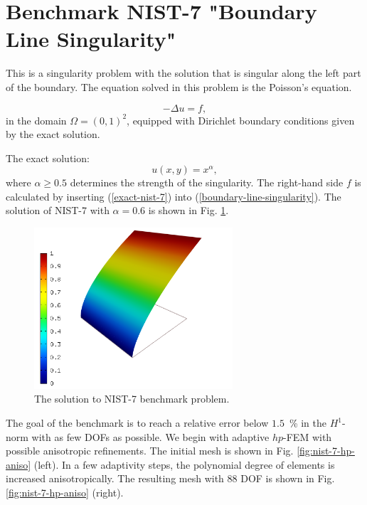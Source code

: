 \section{Benchmark NIST-7 "Boundary Line Singularity"}
\label{sec:bench-7}

This is a singularity problem with the solution that is singular along the left part of the boundary.
The equation solved in this problem is the Poisson's equation.

\begin{equation} \label{boundary-line-singularity}
-\Delta u = f,
\end{equation}
in the domain $\Omega = (0, 1)^2$, equipped with Dirichlet boundary conditions
given by the exact solution.

The exact solution:
\begin{equation}\label{exact-nist-7}
u(x,y) = x^{\alpha},
\end{equation}
where $\alpha \geq 0.5$ determines the strength of the singularity.
The right-hand side $f$ is calculated by inserting (\ref{exact-nist-7}) into (\ref{boundary-line-singularity}).
The solution of NIST-7 with $\alpha = 0.6$ is shown in Fig. \ref{fig:sln-nist07}.

\begin{figure}[!ht]
\centering
\includegraphics[height=6cm]{nist/nist-7/solution.png}
\caption{The solution to NIST-7 benchmark problem.}
\label{fig:sln-nist07}
\end{figure}

The goal of the benchmark is to reach a relative error below
$1.5$~\% in the $H^1$-norm with as few DOFs as possible.
We begin with adaptive $hp$-FEM with possible anisotropic refinements.
The initial mesh is shown in Fig. \ref{fig:nist-7-hp-aniso} (left).
In a few adaptivity steps, the polynomial degree of elements is increased
anisotropically.
The resulting mesh with 88 DOF is shown in Fig. \ref{fig:nist-7-hp-aniso} (right).

